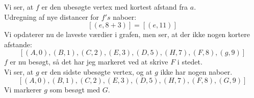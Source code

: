 \documentclass[a4paper,12pt]{article}
\begin{document}
Vi ser, at $f$ er den ubesøgte vertex med kortest afstand fra $a$.\\
Udregning af nye distancer for $f's$ naboer:
\[
[(e,8+3)] = [(e,11)]
\]
Vi opdaterer nu de laveste værdier i grafen, men ser, at der ikke nogen kortere afstande:
\[
[(A,0),(B,1),(C,2),(E,3),(D,5),(H,7),(F,8),(g,9)]
\]
$f$ er nu besøgt, så det har jeg markeret ved at skrive $F$ i stedet.\\

Vi ser, at $g$ er den sidste ubesøgte vertex, og at $g$ ikke har nogen naboer.\\
\[
[(A,0),(B,1),(C,2),(E,3),(D,5),(H,7),(F,8),(G,9)]
\]
Vi markerer $g$ som besøgt med $G$.

\subsection[]{}



\subsection[]{}



\subsection[]{}
\end{document}
